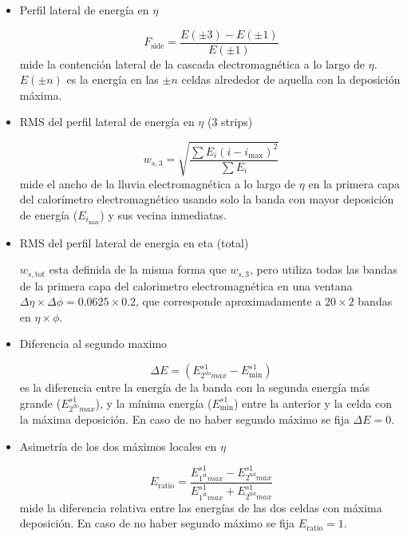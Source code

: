 \begin{itemize}\itemsep0.2cm\parskip0.2cm
\item Perfil lateral de energía en $\eta$

  \begin{equation}
    F_\mathrm{side} = \frac{E(\pm 3) - E(\pm 1)}{E(\pm 1)}
  \end{equation}
  mide la contención lateral de la cascada electromagnética a lo largo de $\eta$.
  $E(\pm n)$ es la energía en las $\pm n$ celdas alrededor de aquella con la deposición máxima.

\item RMS del perfil lateral de energía en $\eta$ (3 strips)

  \begin{equation}
    w_{s,3} = \sqrt{ \frac{\sum E_i (i - i_\mathrm{max})^2}{\sum E_i} }
  \end{equation}
  mide el ancho de la lluvia electromagnética a lo largo de $\eta$ en la primera capa
  del calorímetro electromagnético usando solo la banda con mayor deposición de energía ($E_{i_\mathrm{max}}$)
  y sus vecina inmediatas.

\item RMS del perfil lateral de energia en eta (total)

  $w_{s,\mathrm{tot}}$ esta definida de la misma forma que $w_{s,3}$, pero utiliza todas las bandas de la
  primera capa del calorimetro electromagnética en una ventana $\Delta\eta \times \Delta\phi = 0.0625 \times 0.2$,
  que corresponde aproximadamente a $20 \times 2$ bandas en $\eta \times \phi$.

\item Diferencia al segundo maximo

  \begin{equation}
    \Delta E = (E^{s1}_{2^{\mathrm{do}} max} - E_\mathrm{min}^{s1} )
  \end{equation}
  es la diferencia entre la energía de la banda con la segunda energía más grande ($E^{s1}_{2^{\mathrm{do}} max}$),
  y la mínima energía ($E_\mathrm{min}^{s1}$) entre la anterior y la celda con la máxima deposición. En caso
  de no haber segundo máximo se fija $\Delta E = 0$.

\item Asimetría de los dos máximos locales en $\eta$

  \begin{equation}
    E_\mathrm{ratio} = \frac{ E^{s1}_{1^{\mathrm{st}} max} - E^{s1}_{2^{\mathrm{nd}} max} }{ E^{s1}_{1^{\mathrm{st}} max} + E^{s1}_{2^{\mathrm{nd}} max} }
  \end{equation}
  mide la diferencia relativa entre las energías de las dos celdas con máxima deposición. En caso de no haber segundo máximo
  se fija $E_\mathrm{ratio} = 1$.

\end{itemize}


